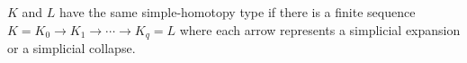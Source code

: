 $K$ and $L$ have the same simple-homotopy type if there is a finite sequence $K = K_0 \rightarrow K_1 \rightarrow \cdots \rightarrow K_q = L$ where each arrow represents a simplicial expansion or a simplicial collapse.
